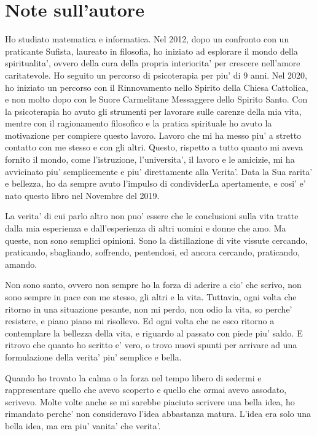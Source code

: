 
\chapter{Note sull'autore}

Ho studiato matematica e informatica. Nel 2012, dopo un confronto con un praticante Sufista, laureato in filosofia, ho iniziato ad esplorare il mondo della spiritualita', ovvero della cura della propria interiorita' per crescere nell'amore caritatevole. Ho seguito un percorso di psicoterapia per piu' di 9 anni. Nel 2020, ho iniziato un percorso con il Rinnovamento nello Spirito della Chiesa Cattolica, e non molto dopo con le Suore Carmelitane Messaggere dello Spirito Santo. Con la psicoterapia ho avuto gli strumenti per lavorare sulle carenze della mia vita, mentre con il ragionamento filosofico e la pratica spirituale ho avuto la motivazione per compiere questo lavoro. Lavoro che mi ha messo piu' a stretto contatto con me stesso e con gli altri. Questo, rispetto a tutto quanto mi aveva fornito il mondo, come l'istruzione, l'universita', il lavoro e le amicizie, mi ha avvicinato piu' semplicemente e piu' direttamente alla Verita'. Data la Sua rarita' e bellezza, ho da sempre avuto l'impulso di condividerLa apertamente, e cosi' e' nato questo libro nel Novembre del 2019.

La verita' di cui parlo altro non puo' essere che le conclusioni sulla vita tratte dalla mia esperienza e dall'esperienza di altri uomini e donne che amo. Ma queste, non sono semplici opinioni. Sono la distillazione di vite vissute cercando, praticando, sbagliando, soffrendo, pentendosi, ed ancora cercando, praticando, amando.

Non sono santo, ovvero non sempre ho la forza di aderire a cio' che scrivo, non sono sempre in pace con me stesso, gli altri e la vita. Tuttavia, ogni volta che ritorno in una situazione pesante, non mi perdo, non odio la vita, so perche' resistere, e piano piano mi risollevo. Ed ogni volta che ne esco ritorno a contemplare la bellezza della vita, e riguardo al passato con piede piu' saldo. E ritrovo che quanto ho scritto e' vero, o trovo nuovi spunti per arrivare ad una formulazione della verita' piu' semplice e bella. 

Quando ho trovato la calma o la forza nel tempo libero di sedermi e rappresentare quello che avevo scoperto e quello che ormai avevo assodato, scrivevo. Molte volte anche se mi sarebbe piaciuto scrivere una bella idea, ho rimandato perche' non consideravo l'idea abbastanza matura. L'idea era solo una bella idea, ma era piu' vanita' che verita'. 


